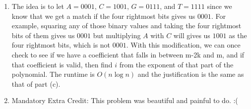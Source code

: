 \documentclass[11pt]{article}
\begin{document}
\begin{enumerate}[label=(\alph*)]
\item
The idea is to let $A = 0001$, $C = 1001$, $G = 0111$, and $T = 1111$ since we know that we get a match if the four rightmost bits gives us $0001$. For example, squaring any of those binary values and taking the four rightmost bits of them gives us $0001$ but multiplying $A$ with $C$ will gives us $1001$ as the four rightmost bits, which is not $0001$. With this modification, we can once check to see if we have a coefficient that falls in between m-2k and m, and if that coefficient is valid, then find $i$ from the exponent of that part of the polynomial. The runtime is $O(n\log{n})$ and the justification is the same as that of part (c).

\item
Mandatory Extra Credit: This problem was beautiful and painful to do. :(

\end{enumerate}
\end{document}
